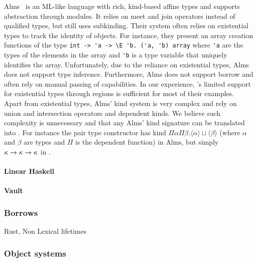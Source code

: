 
Alms~\citep{DBLP:conf/popl/TovP11} is an ML-like language with rich, kind-based
affine types and supports abstraction through modules.
It relies on meet and join operators instead of qualified types, but still
uses subkinding.
Their system often relies on existential types to track the identity
of objects. For instance, they present an array creation
functions of the type \lstinline/int -> 'a -> \E 'b. ('a, 'b) array/ where
\lstinline/'a/ are the types of the elements in the array and \lstinline/'b/
is a type variable that uniquely identifies the array. Unfortunately, due
to the reliance on existential types, Alms does not support type inference.
Furthermore, Alms does not support borrow and often rely
on manual passing of capabilities.
In our experience, \affe's limited support for existential types through
regions is sufficient for most of their examples.
%
Apart from existential types, Alms' kind system is very complex and
rely on union and intersection operators and dependent kinds. We believe
such complexity is unnecessary and that any Alms' kind signature
can be translated into \lang. For instance the pair type constructor
has kind $\Pi\alpha\Pi\beta. \langle\alpha\rangle \sqcup \langle\beta\rangle$
(where $\alpha$ and $\beta$ are types and $\Pi$ is the dependent function)
in Alms, but simply $\kappa\to\kappa\to\kappa$ in \lang.


\paragraph{Linear Haskell~\citep{DBLP:journals/pacmpl/BernardyBNJS18}}

\paragraph{Vault\citep{DBLP:conf/pldi/DeLineF01,DBLP:conf/pldi/FahndrichD02}}

\subsubsection{Borrows}

Rust, Non Lexical lifetimes

\subsubsection{Object systems}
\TODO{}

